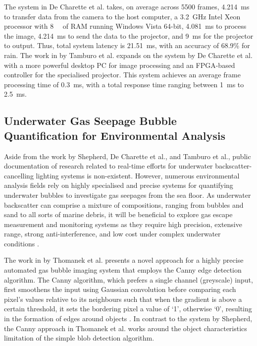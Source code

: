 The system in De Charette et al. takes, on average across 5500 frames, \SI{4.214}{\milli\second} to transfer data from the camera to the host computer, a \SI{3.2}{\giga\hertz} Intel Xeon processor with \SI{8}{\giga\byte} of RAM running Windows Vista 64-bit, \SI{4.081}{\milli\second} to process the image, \SI{4.214}{\milli\second} to send the data to the projector, and \SI{9}{\milli\second} for the projector to output. Thus, total system latency is \SI{21.51}{\milli\second}, with an accuracy of 68.9\% for rain. The work in \cite{tamburoProgrammableAutomotiveHeadlights2014} by Tamburo et al. expands on the system by De Charette et al. with a more powerful desktop PC for image processing and an FPGA-based controller for the specialised projector. This system achieves an average frame processing time of \SI{0.3}{\milli\second}, with a total response time ranging between \SI{1}{\milli\second} to \SI{2.5}{\milli\second}.

\subsection{Underwater Gas Seepage Bubble Quantification for Environmental Analysis}
\label{gasquant}

Aside from the work by Shepherd, De Charette et al., and Tamburo et al., public documentation of research related to real-time efforts for underwater backscatter-cancelling lighting systems is non-existent. However, numerous environmental analysis fields rely on highly specialised and precise systems for quantifying underwater bubbles to investigate gas seepages from the sea floor. As underwater backscatter can comprise a mixture of compositions, ranging from bubbles and sand to all sorts of marine debris, it will be beneficial to explore gas escape measurement and monitoring systems as they require high precision, extensive range, strong anti-interference, and low cost under complex underwater conditions \cite{zhangUnderwaterBubbleEscape2023}.

The work in \cite{thomanekAutomatedGasBubble2010} by Thomanek et al. presents a novel approach for a highly precise automated gas bubble imaging system that employs the Canny edge detection algorithm. The Canny algorithm, which prefers a single channel (greyscale) input, first smoothens the input using Gaussian convolution before comparing each pixel's values relative to its neighbours such that when the gradient is above a certain threshold, it sets the bordering pixel a value of `1', otherwise `0', resulting in the formation of edges around objects \cite{cannyComputationalApproachEdge1986a}. In contrast to the system by Shepherd, the Canny approach in Thomanek et al. works around the object characteristics limitation of the simple blob detection algorithm.


